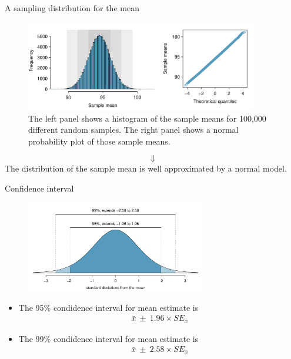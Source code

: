 \documentclass[12pt,a4paper]{beamer}
\begin{document}
\begin{frame}{A sampling distribution for the mean}
	\begin{figure}[hht]
	   \centering
	   \includegraphics[width=0.9\textwidth]{figures/netTimeBigSamplingDistribution/netTimeBigSamplingDistribution}
	   \caption{The left panel shows a histogram of the sample means for 100,000 different random samples. The right panel shows a normal probability plot of those sample means.}
	\end{figure}
	\[\Downarrow\]
	The distribution of the sample mean is well approximated by a normal model.
\end{frame}
\begin{frame}{Confidence interval}
	\begin{figure}
	\centering
	\includegraphics[width=0.7\textwidth]{figures/choosingZForCI/choosingZForCI}\end{figure}
		\begin{itemize}
			\item The 95\% condidence interval for mean estimate is
				\begin{eqnarray*}
				\bar{x}\ \pm\ 1.96\times SE_{\bar{x}}
			\end{eqnarray*}
	\item The 99\% condidence interval for mean estimate is
		\begin{eqnarray*}
		\bar{x}\ \pm\ 2.58\times SE_{\bar{x}}
		\end{eqnarray*}
	\end{itemize}
\end{frame}
\end{document}

